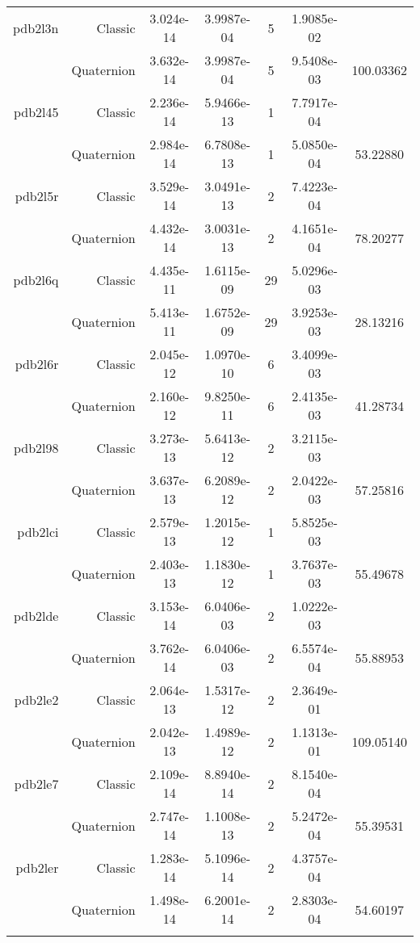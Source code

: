 \begin{xltabular}{\textwidth}{r|rS[table-format=1.3e+2]S[table-format=1.4e+2]cS[table-format=1.4e+2]S[table-format=-1.5]}
pdb2l3n & Classic & 3.024e-14 & 3.9987e-04 & 5 & 1.9085e-02 & \\
& Quaternion & 3.632e-14 & 3.9987e-04 & 5 & 9.5408e-03 & 100.03362\\  \addlinespace
pdb2l45 & Classic & 2.236e-14 & 5.9466e-13 & 1 & 7.7917e-04 & \\
& Quaternion & 2.984e-14 & 6.7808e-13 & 1 & 5.0850e-04 & 53.22880\\  \addlinespace
pdb2l5r & Classic & 3.529e-14 & 3.0491e-13 & 2 & 7.4223e-04 & \\
& Quaternion & 4.432e-14 & 3.0031e-13 & 2 & 4.1651e-04 & 78.20277\\  \addlinespace
pdb2l6q & Classic & 4.435e-11 & 1.6115e-09 & 29 & 5.0296e-03 & \\
& Quaternion & 5.413e-11 & 1.6752e-09 & 29 & 3.9253e-03 & 28.13216\\  \addlinespace
pdb2l6r & Classic & 2.045e-12 & 1.0970e-10 & 6 & 3.4099e-03 & \\
& Quaternion & 2.160e-12 & 9.8250e-11 & 6 & 2.4135e-03 & 41.28734\\  \addlinespace
pdb2l98 & Classic & 3.273e-13 & 5.6413e-12 & 2 & 3.2115e-03 & \\
& Quaternion & 3.637e-13 & 6.2089e-12 & 2 & 2.0422e-03 & 57.25816\\  \addlinespace
pdb2lci & Classic & 2.579e-13 & 1.2015e-12 & 1 & 5.8525e-03 & \\
& Quaternion & 2.403e-13 & 1.1830e-12 & 1 & 3.7637e-03 & 55.49678\\  \addlinespace
pdb2lde & Classic & 3.153e-14 & 6.0406e-03 & 2 & 1.0222e-03 & \\
& Quaternion & 3.762e-14 & 6.0406e-03 & 2 & 6.5574e-04 & 55.88953\\  \addlinespace
pdb2le2 & Classic & 2.064e-13 & 1.5317e-12 & 2 & 2.3649e-01 & \\
& Quaternion & 2.042e-13 & 1.4989e-12 & 2 & 1.1313e-01 & 109.05140\\  \addlinespace
pdb2le7 & Classic & 2.109e-14 & 8.8940e-14 & 2 & 8.1540e-04 & \\
& Quaternion & 2.747e-14 & 1.1008e-13 & 2 & 5.2472e-04 & 55.39531\\  \addlinespace
pdb2ler & Classic & 1.283e-14 & 5.1096e-14 & 2 & 4.3757e-04 & \\
& Quaternion & 1.498e-14 & 6.2001e-14 & 2 & 2.8303e-04 & 54.60197\\  \addlinespace

\end{xltabular}
